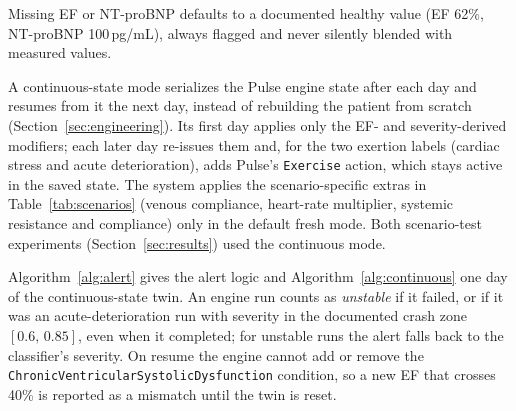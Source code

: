 \documentclass[conference]{IEEEtran}
\newcommand{\code}[1]{\texttt{\footnotesize #1}}
\begin{document}
Missing EF or NT-proBNP defaults to a documented healthy value (EF 62\%, NT-proBNP 100\,pg/mL), always flagged and never silently blended with measured values.

A continuous-state mode serializes the Pulse engine state after each day and resumes from it the next day, instead of rebuilding the patient from scratch (Section~\ref{sec:engineering}). Its first day applies only the EF- and severity-derived modifiers; each later day re-issues them and, for the two exertion labels (cardiac stress and acute deterioration), adds Pulse's \code{Exercise} action, which stays active in the saved state. The system applies the scenario-specific extras in Table~\ref{tab:scenarios} (venous compliance, heart-rate multiplier, systemic resistance and compliance) only in the default fresh mode. Both scenario-test experiments (Section~\ref{sec:results}) used the continuous mode.

Algorithm~\ref{alg:alert} gives the alert logic and Algorithm~\ref{alg:continuous} one day of the continuous-state twin. An engine run counts as \emph{unstable} if it failed, or if it was an acute-deterioration run with severity in the documented crash zone $[0.6,\,0.85]$, even when it completed; for unstable runs the alert falls back to the classifier's severity. On resume the engine cannot add or remove the \code{ChronicVentricularSystolicDysfunction} condition, so a new EF that crosses 40\% is reported as a mismatch until the twin is reset.
\end{document}

